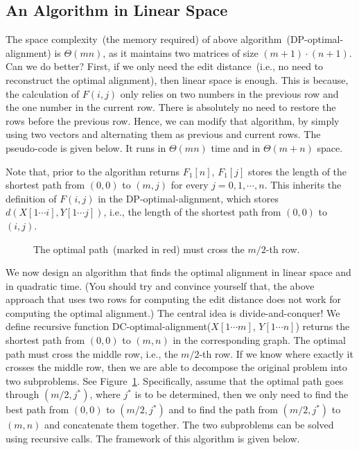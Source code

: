 \subsection*{An Algorithm in Linear Space}

The space complexity~(the memory required) of above algorithm~(DP-optimal-alignment) is $\Theta(mn)$,
as it maintains two matrices of size $(m+1)\cdot(n+1)$.  Can we do better?
First, if we only need the edit distance~(i.e., no need to reconstruct the optimal alignment), then linear space
is enough. This is because, the calculation of $F(i,j)$ only relies on two numbers in the previous row and
the one number in the current row. There is absolutely no need to restore the rows before the previous row.
Hence, we can modify that algorithm, by simply using two vectors and alternating them as previous and current rows.
The pseudo-code is given below. It runs in $\Theta(mn)$ time and in $\Theta(m+n)$ space.

\begin{algorithmblock}[0.8\textwidth]
	\xxx
	\xxx
	\xxx
	\xxx
	\xxx
	\xxx
	\xxx
	\xxx
\end{algorithmblock}

Note that, prior to the algorithm returns $F_1[n]$, 
$F_1[j]$ stores the length of the shortest path from $(0,0)$ to $(m, j)$ for
every $j = 0, 1, \cdots, n$. This inherits the definition of $F(i,j)$ in the DP-optimal-alignment,
which stores $d(X[1\cdots i], Y[1\cdots j])$, i.e., the length of the shortest path from $(0,0)$ to $(i,j)$.

\begin{figure}[b!]
\centering{}
\caption{The optimal path~(marked in red) must cross the $m/2$-th row.}
\label{fig:middle}
\end{figure}



We now design an algorithm that finds the optimal alignment in linear space and in quadratic time.
(You should try and convince yourself that, the above approach that uses two rows for computing the 
edit distance does not work for computing the optimal alignment.)
The central idea is divide-and-conquer! We define recursive function DC-optimal-alignment($X[1\cdots m]$, $Y[1\cdots n]$)
returns the shortest path from $(0,0)$ to $(m,n)$ in the corresponding graph.
The optimal path must cross the middle row, i.e., the $m/2$-th row.
If we know where exactly it crosses the middle row, then we are able to decompose the original problem
into two subproblems. 
See Figure~\ref{fig:middle}.
Specifically, assume that the optimal path goes through $(m/2, j^*)$, where
$j^*$ is to be determined, then we only need to find the best path from $(0, 0)$ to $(m/2, j^*)$
and to find the path from $(m/2, j^*)$ to $(m,n)$ and concatenate them together. The two subproblems
can be solved using recursive calls. The framework of this algorithm is given below.


